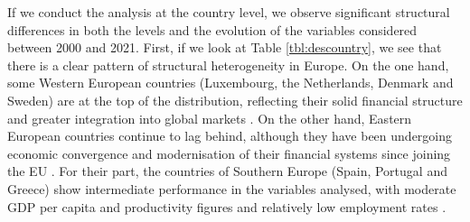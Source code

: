 \documentclass[a4paper,11pt,oneside]{article}
\begin{document}
If we conduct the analysis at the country level, we observe significant structural differences in both the levels and the evolution of the variables considered between 2000 and 2021. First, if we look at Table \ref{tbl:descountry}, we see that there is a clear pattern of structural heterogeneity in Europe. On the one hand, some Western European countries (Luxembourg, the Netherlands, Denmark and Sweden) are at the top of the distribution, reflecting their solid financial structure and greater integration into global markets \citep{beck2000finance, lane2007external}. On the other hand, Eastern European countries continue to lag behind, although they have been undergoing economic convergence and modernisation of their financial systems since joining the EU \citep{iammarino2019regional}. For their part, the countries of Southern Europe (Spain, Portugal and Greece) show intermediate performance in the variables analysed, with moderate GDP per capita and productivity figures and relatively low employment rates \citep{fernandez2013political, rodriguez2018revenge}.

\color{black}




\end{document}
